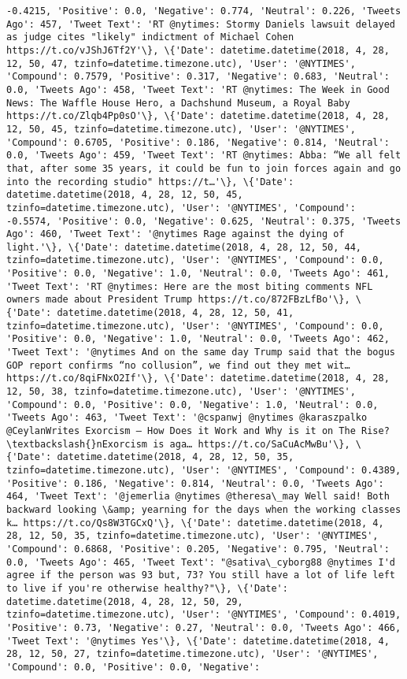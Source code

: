 \documentclass[11pt]{article}
\begin{document}
\begin{Verbatim}[commandchars=\\\{\}]
-0.4215, 'Positive': 0.0, 'Negative': 0.774, 'Neutral': 0.226, 'Tweets Ago': 457, 'Tweet Text': 'RT @nytimes: Stormy Daniels lawsuit delayed as judge cites "likely" indictment of Michael Cohen https://t.co/vJShJ6Tf2Y'\}, \{'Date': datetime.datetime(2018, 4, 28, 12, 50, 47, tzinfo=datetime.timezone.utc), 'User': '@NYTIMES', 'Compound': 0.7579, 'Positive': 0.317, 'Negative': 0.683, 'Neutral': 0.0, 'Tweets Ago': 458, 'Tweet Text': 'RT @nytimes: The Week in Good News: The Waffle House Hero, a Dachshund Museum, a Royal Baby https://t.co/Zlqb4Pp0sO'\}, \{'Date': datetime.datetime(2018, 4, 28, 12, 50, 45, tzinfo=datetime.timezone.utc), 'User': '@NYTIMES', 'Compound': 0.6705, 'Positive': 0.186, 'Negative': 0.814, 'Neutral': 0.0, 'Tweets Ago': 459, 'Tweet Text': 'RT @nytimes: Abba: “We all felt that, after some 35 years, it could be fun to join forces again and go into the recording studio" https://t…'\}, \{'Date': datetime.datetime(2018, 4, 28, 12, 50, 45, tzinfo=datetime.timezone.utc), 'User': '@NYTIMES', 'Compound': -0.5574, 'Positive': 0.0, 'Negative': 0.625, 'Neutral': 0.375, 'Tweets Ago': 460, 'Tweet Text': '@nytimes Rage against the dying of light.'\}, \{'Date': datetime.datetime(2018, 4, 28, 12, 50, 44, tzinfo=datetime.timezone.utc), 'User': '@NYTIMES', 'Compound': 0.0, 'Positive': 0.0, 'Negative': 1.0, 'Neutral': 0.0, 'Tweets Ago': 461, 'Tweet Text': 'RT @nytimes: Here are the most biting comments NFL owners made about President Trump https://t.co/872FBzLfBo'\}, \{'Date': datetime.datetime(2018, 4, 28, 12, 50, 41, tzinfo=datetime.timezone.utc), 'User': '@NYTIMES', 'Compound': 0.0, 'Positive': 0.0, 'Negative': 1.0, 'Neutral': 0.0, 'Tweets Ago': 462, 'Tweet Text': '@nytimes And on the same day Trump said that the bogus GOP report confirms “no collusion”, we find out they met wit… https://t.co/8qiFNxO2If'\}, \{'Date': datetime.datetime(2018, 4, 28, 12, 50, 38, tzinfo=datetime.timezone.utc), 'User': '@NYTIMES', 'Compound': 0.0, 'Positive': 0.0, 'Negative': 1.0, 'Neutral': 0.0, 'Tweets Ago': 463, 'Tweet Text': '@cspanwj @nytimes @karaszpalko @CeylanWrites Exorcism – How Does it Work and Why is it on The Rise?\textbackslash{}nExorcism is aga… https://t.co/SaCuAcMwBu'\}, \{'Date': datetime.datetime(2018, 4, 28, 12, 50, 35, tzinfo=datetime.timezone.utc), 'User': '@NYTIMES', 'Compound': 0.4389, 'Positive': 0.186, 'Negative': 0.814, 'Neutral': 0.0, 'Tweets Ago': 464, 'Tweet Text': '@jemerlia @nytimes @theresa\_may Well said! Both backward looking \&amp; yearning for the days when the working classes k… https://t.co/Qs8W3TGCxQ'\}, \{'Date': datetime.datetime(2018, 4, 28, 12, 50, 35, tzinfo=datetime.timezone.utc), 'User': '@NYTIMES', 'Compound': 0.6868, 'Positive': 0.205, 'Negative': 0.795, 'Neutral': 0.0, 'Tweets Ago': 465, 'Tweet Text': "@sativa\_cyborg88 @nytimes I'd agree if the person was 93 but, 73? You still have a lot of life left to live if you're otherwise healthy?"\}, \{'Date': datetime.datetime(2018, 4, 28, 12, 50, 29, tzinfo=datetime.timezone.utc), 'User': '@NYTIMES', 'Compound': 0.4019, 'Positive': 0.73, 'Negative': 0.27, 'Neutral': 0.0, 'Tweets Ago': 466, 'Tweet Text': '@nytimes Yes'\}, \{'Date': datetime.datetime(2018, 4, 28, 12, 50, 27, tzinfo=datetime.timezone.utc), 'User': '@NYTIMES', 'Compound': 0.0, 'Positive': 0.0, 'Negative': 
\end{Verbatim}
\end{document}
